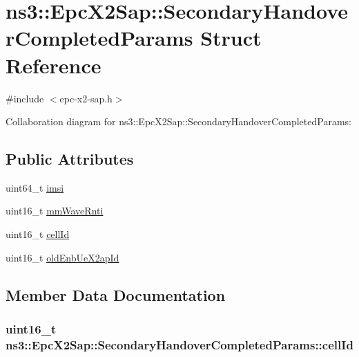 \hypertarget{structns3_1_1EpcX2Sap_1_1SecondaryHandoverCompletedParams}{}\section{ns3\+:\+:Epc\+X2\+Sap\+:\+:Secondary\+Handover\+Completed\+Params Struct Reference}
\label{structns3_1_1EpcX2Sap_1_1SecondaryHandoverCompletedParams}


{\ttfamily \#include $<$epc-\/x2-\/sap.\+h$>$}



Collaboration diagram for ns3\+:\+:Epc\+X2\+Sap\+:\+:Secondary\+Handover\+Completed\+Params\+:
\subsection*{Public Attributes}
\begin{DoxyCompactItemize}
\item 
uint64\+\_\+t \hyperlink{structns3_1_1EpcX2Sap_1_1SecondaryHandoverCompletedParams_a23af85572be34179f2f5b7a3713553fe}{imsi}
\item 
uint16\+\_\+t \hyperlink{structns3_1_1EpcX2Sap_1_1SecondaryHandoverCompletedParams_a0e049d9cc4f59455c19758bf0584d636}{mm\+Wave\+Rnti}
\item 
uint16\+\_\+t \hyperlink{structns3_1_1EpcX2Sap_1_1SecondaryHandoverCompletedParams_a1d00ca9d2593a3e6a969e67e5b622bfb}{cell\+Id}
\item 
uint16\+\_\+t \hyperlink{structns3_1_1EpcX2Sap_1_1SecondaryHandoverCompletedParams_a1dc13fce760bdb8f39665caec7db65a4}{old\+Enb\+Ue\+X2ap\+Id}
\end{DoxyCompactItemize}


\subsection{Member Data Documentation}
\subsubsection[{\texorpdfstring{cell\+Id}{cellId}}]{\setlength{\rightskip}{0pt plus 5cm}uint16\+\_\+t ns3\+::\+Epc\+X2\+Sap\+::\+Secondary\+Handover\+Completed\+Params\+::cell\+Id}\hypertarget{structns3_1_1EpcX2Sap_1_1SecondaryHandoverCompletedParams_a1d00ca9d2593a3e6a969e67e5b622bfb}{}\label{structns3_1_1EpcX2Sap_1_1SecondaryHandoverCompletedParams_a1d00ca9d2593a3e6a969e67e5b622bfb}
